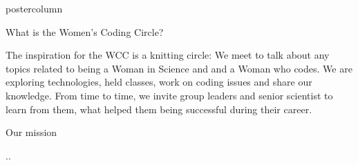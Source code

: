 \documentclass{beamer}
\begin{document}
\begin{frame}
\begin{columns}
\begin{column}{.33\textwidth}
\begin{beamercolorbox}[center,wd=\textwidth]{postercolumn}
\begin{minipage}[T]{.95\textwidth}
{\begin{myblock}{What is the Women's Coding Circle?}
\begin{addmargin}[1em]{1em}
                            The inspiration for the WCC is a knitting circle: We meet to talk about any topics related to being a Woman in Science and and a Woman who codes.
                            We are exploring technologies, held classes, work on coding issues and share our knowledge.\newline
                            From time to time, we invite group leaders and senior scientist to learn from them, what helped them being successful during their career.
                        \end{addmargin}
                    \end{myblock}
                    \vspace{1.25cm}
                    \begin{myblock}{Our mission}
                        \begin{addmargin}[1em]{1em}
                                ..


\end{addmargin}
\end{myblock}}
\end{minipage}
\end{beamercolorbox}
\end{column}
\end{columns}
\end{frame}
\end{document}
